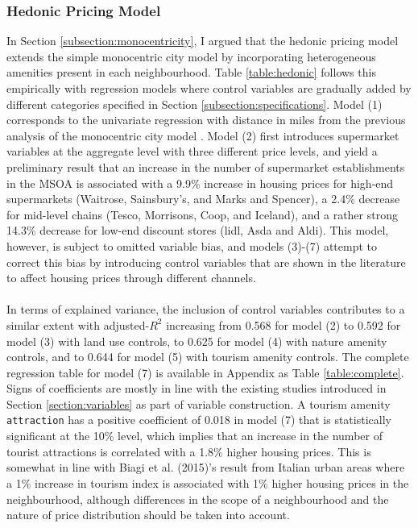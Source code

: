 \documentclass{article}
\begin{document}
\subsubsection{Hedonic Pricing Model} \label{subsubsection:result:hedonic}
In Section \ref{subsection:monocentricity}, I argued that the hedonic pricing model extends the simple monocentric city model by incorporating heterogeneous amenities present in each neighbourhood. Table \ref{table:hedonic} follows this empirically with regression models where control variables are gradually added by different categories specified in Section \ref{subsection:specifications}. Model (1) corresponds to the univariate regression with distance in miles from the previous analysis of the monocentric city model . Model (2) first introduces supermarket variables at the aggregate level with three different price levels, and yield a preliminary result that an increase in the number of supermarket establishments in the MSOA is associated with a 9.9\% increase in housing prices for high-end supermarkets (Waitrose, Sainsbury's, and Marks and Spencer), a 2.4\% decrease for mid-level chains (Tesco, Morrisons, Coop, and Iceland), and a rather strong 14.3\% decrease for low-end discount stores (lidl, Asda and Aldi). This model, however, is subject to omitted variable bias, and models (3)-(7) attempt to correct this bias by introducing control variables that are shown in the literature to affect housing prices through different channels. \\\\
In terms of explained variance, the inclusion of control variables contributes to a similar extent with adjusted-$R^2$ increasing from 0.568 for model (2) to 0.592 for model (3) with land use controls, to 0.625 for model (4) with nature amenity controls, and to 0.644 for model (5) with tourism amenity controls. The complete regression table for model (7) is available in Appendix as Table \ref{table:complete}. Signs of coefficients are mostly in line with the existing studies introduced in Section \ref{section:variables} as part of variable construction. A tourism amenity \texttt{attraction} has a positive coefficient of 0.018 in model (7) that is statistically significant at the 10\% level, which implies that an increase in the number of tourist attractions is correlated with a 1.8\% higher housing prices. This is somewhat in line with Biagi et al. (2015)'s result from Italian urban areas where a 1\% increase in tourism index is associated with 1\% higher housing prices in the neighbourhood, although differences in the scope of a neighbourhood and the nature of price distribution should be taken into account. \\\\
\end{document}

